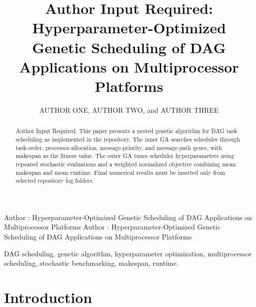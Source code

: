 \documentclass{ieeeaccess}
\begin{document}
\title{Author Input Required: Hyperparameter-Optimized Genetic Scheduling of DAG Applications on Multiprocessor Platforms}

\author{\uppercase{Author One},
\uppercase{Author Two}, and
\uppercase{Author Three}}

\address[1]{Author Input Required}
\address[2]{Author Input Required}

\markboth
{Author \headeretal: Hyperparameter-Optimized Genetic Scheduling of DAG Applications on Multiprocessor Platforms}
{Author \headeretal: Hyperparameter-Optimized Genetic Scheduling of DAG Applications on Multiprocessor Platforms}


\begin{abstract}
Author Input Required. This paper presents a nested genetic algorithm for DAG task scheduling as implemented in the repository. The inner GA searches schedules through task-order, processor-allocation, message-priority, and message-path genes, with makespan as the fitness value. The outer GA tunes scheduler hyperparameters using repeated stochastic evaluations and a weighted normalized objective combining mean makespan and mean runtime. Final numerical results must be inserted only from selected repository log folders.
\end{abstract}

\begin{keywords}
DAG scheduling, genetic algorithm, hyperparameter optimization, multiprocessor scheduling, stochastic benchmarking, makespan, runtime.
\end{keywords}

\titlepgskip=-15pt
\maketitle

\section{Introduction}
\label{sec:introduction}

\end{document}
